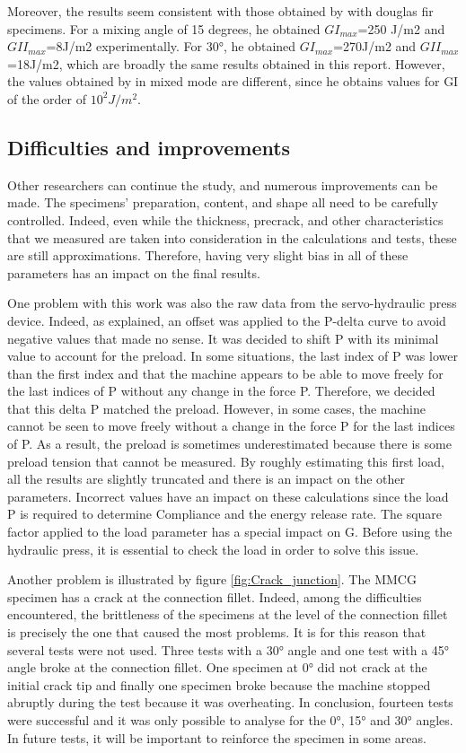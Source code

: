 Moreover, the results seem consistent with those obtained by \cite{MoutouPitti2008} with douglas fir specimens. For a mixing angle of 15 degrees, he obtained $GI_{max}$=250 J/m2 and $GII_{max}$=8J/m2 experimentally. For 30°, he obtained $GI_{max}$=270J/m2 and $GII_{max}$=18J/m2, which are broadly the same results obtained in this report.
However, the values obtained by \cite{Odounga2018phd} in mixed mode are different, since he obtains values for GI of the order of $10^2 J/m^2$.

\subsection{Difficulties and improvements}

Other researchers can continue the study, and numerous improvements can be made. The specimens' preparation, content, and shape all need to be carefully controlled. Indeed, even while the thickness, precrack, and other characteristics that we measured are taken into consideration in the calculations and tests, these are still approximations. Therefore, having very slight bias in all of these parameters has an impact on the final results.

One problem with this work was also the raw data from the servo-hydraulic press device. Indeed, as explained, an offset was applied to the P-delta curve to avoid negative values that made no sense. It was decided to shift P with its minimal value to account for the preload. In some situations, the last index of P was lower than the first index and that the machine appears to be able to move freely for the last indices of P without any change in the force P. Therefore, we decided that this delta P matched the preload. However, in some cases, the machine cannot be seen to move freely without a change in the force P for the last indices of P. As a result, the preload is sometimes underestimated because there is some preload tension that cannot be measured.
By roughly estimating this first load, all the results are slightly truncated and there is an impact on the other parameters. Incorrect values have an impact on these calculations since the load P is required to determine Compliance and the energy release rate. The square factor applied to the load parameter has a special impact on G. Before using the hydraulic press, it is essential to check the load in order to solve this issue. 

Another problem is illustrated by figure \ref{fig:Crack_junction}. The MMCG specimen has a crack at the connection fillet. Indeed, among the difficulties encountered, the brittleness of the specimens at the level of the connection fillet is precisely the one that caused the most problems. It is for this reason that several tests were not used. Three tests with a 30° angle and one test with a 45° angle broke at the connection fillet. One specimen at 0° did not crack at the initial crack tip and finally one specimen broke because the machine stopped abruptly during the test because it was overheating. In conclusion, fourteen tests were successful and it was only possible to analyse for the 0°, 15° and 30° angles. In future tests, it will be important to reinforce the specimen in some areas.

